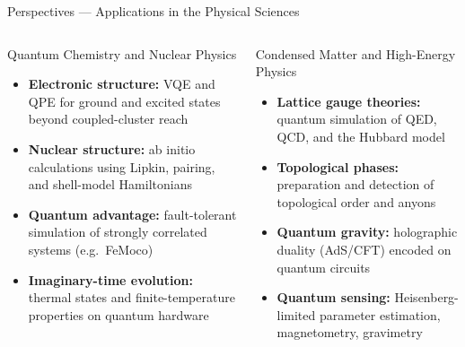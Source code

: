 \documentclass[aspectratio=169,10pt]{beamer}
\begin{document}
\begin{frame}{Perspectives --- Applications in the Physical Sciences}
  \begin{columns}[T]
      \begin{block}{Quantum Chemistry and Nuclear Physics}
        \begin{itemize}\footnotesize\itemsep1pt
          \item \textbf{Electronic structure:}
                VQE and QPE for ground and excited
                states beyond coupled-cluster reach
          \item \textbf{Nuclear structure:}
                ab initio calculations using Lipkin,
                pairing, and shell-model Hamiltonians
          \item \textbf{Quantum advantage:}
                fault-tolerant simulation of strongly
                correlated systems (e.g.\ FeMoco)
          \item \textbf{Imaginary-time evolution:}
                thermal states and finite-temperature
                properties on quantum hardware
        \end{itemize}
      \end{block}
      \begin{block}{Condensed Matter and High-Energy Physics}
        \begin{itemize}\footnotesize\itemsep1pt
          \item \textbf{Lattice gauge theories:}
                quantum simulation of QED, QCD,
                and the Hubbard model
          \item \textbf{Topological phases:}
                preparation and detection of
                topological order and anyons
          \item \textbf{Quantum gravity:}
                holographic duality (AdS/CFT)
                encoded on quantum circuits
          \item \textbf{Quantum sensing:}
                Heisenberg-limited parameter
                estimation, magnetometry,
                gravimetry
        \end{itemize}
      \end{block}
  \end{columns}
\end{frame}
\end{document}
